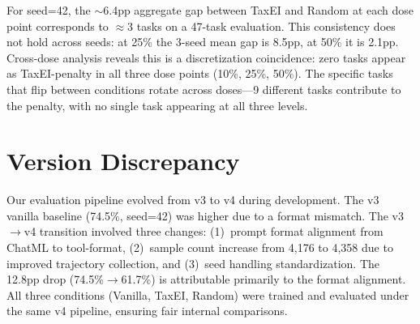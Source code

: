 For seed=42, the $\sim$6.4pp aggregate gap between TaxEI and Random at each dose point corresponds to $\approx$3 tasks on a 47-task evaluation. This consistency does not hold across seeds: at 25\% the 3-seed mean gap is 8.5pp, at 50\% it is 2.1pp. Cross-dose analysis reveals this is a discretization coincidence: zero tasks appear as TaxEI-penalty in all three dose points (10\%, 25\%, 50\%). The specific tasks that flip between conditions rotate across doses---9 different tasks contribute to the penalty, with no single task appearing at all three levels.

\section{Version Discrepancy}
\label{app:version}

Our evaluation pipeline evolved from v3 to v4 during development. The v3 vanilla baseline (74.5\%, seed=42) was higher due to a format mismatch. The v3$\to$v4 transition involved three changes: (1)~prompt format alignment from ChatML to tool-format, (2)~sample count increase from 4{,}176 to 4{,}358 due to improved trajectory collection, and (3)~seed handling standardization. The 12.8pp drop (74.5\%$\to$61.7\%) is attributable primarily to the format alignment. All three conditions (Vanilla, TaxEI, Random) were trained and evaluated under the same v4 pipeline, ensuring fair internal comparisons.

